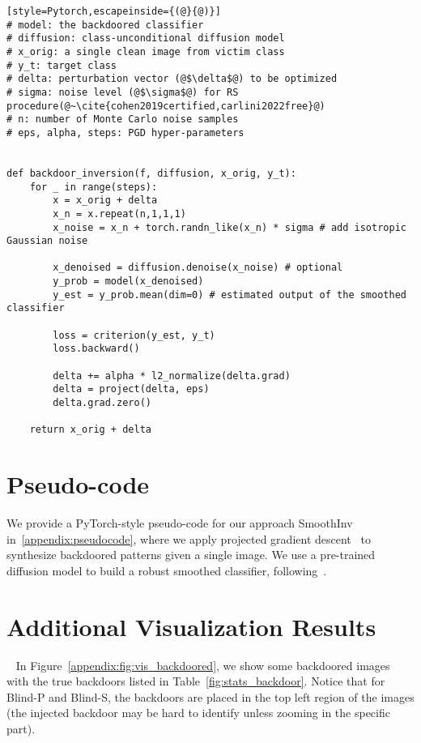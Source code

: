 \documentclass[10pt,twocolumn,letterpaper]{article}
\begin{document}
\begin{algorithm}[ht!]
\caption{SmoothInv  (PyTorch-style)}
\label{appendix:pseudocode}
\begin{lstlisting}[style=Pytorch,escapeinside={(@}{@)}]
# model: the backdoored classifier
# diffusion: class-unconditional diffusion model
# x_orig: a single clean image from victim class 
# y_t: target class
# delta: perturbation vector (@$\delta$@) to be optimized
# sigma: noise level (@$\sigma$@) for RS procedure(@~\cite{cohen2019certified,carlini2022free}@)
# n: number of Monte Carlo noise samples
# eps, alpha, steps: PGD hyper-parameters 


def backdoor_inversion(f, diffusion, x_orig, y_t):
    for _ in range(steps):
        x = x_orig + delta
        x_n = x.repeat(n,1,1,1)
        x_noise = x_n + torch.randn_like(x_n) * sigma # add isotropic Gaussian noise

        x_denoised = diffusion.denoise(x_noise) # optional
        y_prob = model(x_denoised) 
        y_est = y_prob.mean(dim=0) # estimated output of the smoothed classifier

        loss = criterion(y_est, y_t)
        loss.backward()

        delta += alpha * l2_normalize(delta.grad)
        delta = project(delta, eps)
        delta.grad.zero()

    return x_orig + delta
\end{lstlisting}
\end{algorithm}

\section{Pseudo-code}\label{appendix:pseudo-code}
We provide a PyTorch-style pseudo-code for our approach SmoothInv in~\cref{appendix:pseudocode}, where we apply projected gradient descent~\cite{pgd_madry} to synthesize backdoored patterns given a single image. We use a pre-trained diffusion model to build a robust smoothed classifier, following~\cite{carlini2022free}. 


\section{Additional Visualization Results}~\label{appendix:visualization}
In Figure~\ref{appendix:fig:vis_backdoored}, we show some backdoored images with the true backdoors listed in Table~\ref{fig:stats_backdoor}. Notice that for Blind-P and Blind-S, the backdoors are placed in the top left region of the images (the injected backdoor may be hard to identify unless zooming in the specific part).
\end{document}
